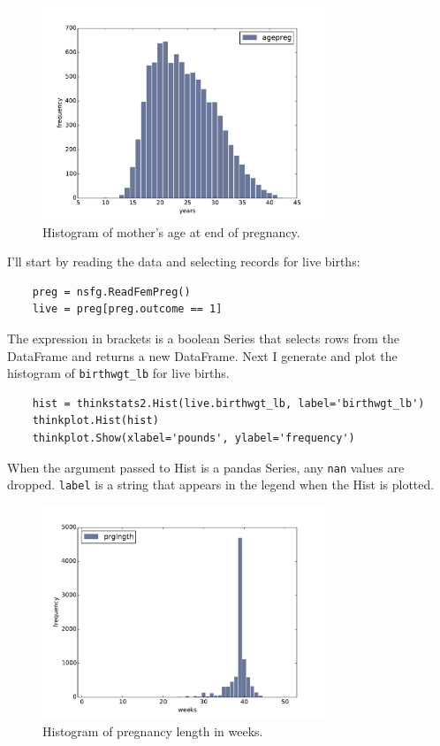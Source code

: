 \documentclass[12pt]{book}
\begin{document}
\begin{figure}
\centerline{\includegraphics[height=2.5in]{figs/first_agepreg_hist.pdf}}
\caption{Histogram of mother's age at end of pregnancy.}
\label{first_agepreg_hist}
\end{figure}

I'll start by reading the data and selecting records for live
births:

\begin{verbatim}
    preg = nsfg.ReadFemPreg()
    live = preg[preg.outcome == 1]
\end{verbatim}

The expression in brackets is a boolean Series that
selects rows from the DataFrame and returns a new DataFrame.
Next I generate and plot the histogram of
\verb"birthwgt_lb" for live births.

\begin{verbatim}
    hist = thinkstats2.Hist(live.birthwgt_lb, label='birthwgt_lb')
    thinkplot.Hist(hist)
    thinkplot.Show(xlabel='pounds', ylabel='frequency')
\end{verbatim}

When the argument passed to Hist is a pandas Series, any
{\tt nan} values are dropped.  {\tt label} is a string that appears
in the legend when the Hist is plotted.

\begin{figure}
\centerline{\includegraphics[height=2.5in]{figs/first_prglngth_hist.pdf}}
\caption{Histogram of pregnancy length in weeks.}
\label{first_prglngth_hist}
\end{figure}
\end{document}
